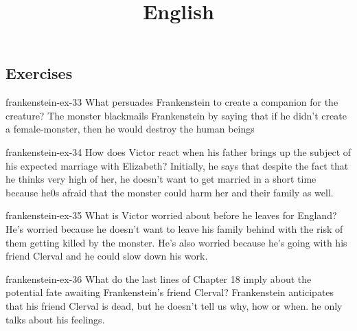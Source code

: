 \documentclass[preview]{standalone}
\begin{document}
\title{English}
\genpage

\subsection{Exercises}

\begin{snippetexercise}{frankenstein-ex-33}
    {What persuades Frankenstein to create a companion for the creature?}
    The monster blackmails Frankenstein by saying that if he didn't create a female-monster,
    then he would destroy the human beings 
\end{snippetexercise}

\begin{snippetexercise}{frankenstein-ex-34}
    {How does Victor react when his father brings up the subject of his expected marriage with
    Elizabeth?}
    Initially, he says that despite the fact that he thinks very high of her, he doesn't want
    to get married in a short time because he0s afraid that the monster could 
    harm her and their family as well.
\end{snippetexercise}

\begin{snippetexercise}{frankenstein-ex-35}
    {What is Victor worried about before he leaves for England?}
    He's worried because he doesn't want to leave his family behind
    with the risk of them getting killed by the monster.
    He's also worried because he's going with his friend Clerval and he could 
    slow down his work.
\end{snippetexercise}

\begin{snippetexercise}{frankenstein-ex-36}
    {What do the last lines of Chapter 18 imply about the potential fate awaiting Frankenstein's friend
    Clerval?}
    Frankenstein anticipates that his friend Clerval is dead, but he doesn't tell us why,
    how or when. he only talks about his feelings. 
\end{snippetexercise}
\end{document}
